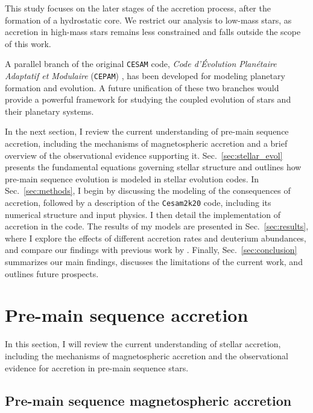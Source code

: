 \documentclass[12pt,a4paper]{article}
\begin{document}
This study focuses on the later stages of the accretion process, after the formation of a hydrostatic core. We restrict our analysis to low-mass stars, as accretion in high-mass stars remains less constrained and falls outside the scope of this work.

A parallel branch of the original \texttt{CESAM} code, \textit{Code d'Évolution Planétaire Adaptatif et Modulaire} (\texttt{CEPAM}) \parencite{GuillotMorel1995}, has been developed for modeling planetary formation and evolution. A future unification of these two branches would provide a powerful framework for studying the coupled evolution of stars and their planetary systems.

In the next section, I review the current understanding of pre-main sequence accretion, including the mechanisms of magnetospheric accretion and a brief overview of the observational evidence supporting it. Sec.~\ref{sec:stellar_evol} presents the fundamental equations governing stellar structure and outlines how pre-main sequence evolution is modeled in stellar evolution codes. In Sec.~\ref{sec:methods}, I begin by discussing the modeling of the consequences of accretion, followed by a description of the \texttt{Cesam2k20} code, including its numerical structure and input physics. I then detail the implementation of accretion in the code. The results of my models are presented in Sec.~\ref{sec:results}, where I explore the effects of different accretion rates and deuterium abundances, and compare our findings with previous work by \textcite{PallaStahler1993}. Finally, Sec.~\ref{sec:conclusion} summarizes our main findings, discusses the limitations of the current work, and outlines future prospects.

\section{Pre-main sequence accretion}
\label{sec:background}

In this section, I will review the current understanding of stellar accretion, including the mechanisms of magnetospheric accretion and the observational evidence for accretion in pre-main sequence stars. 

\subsection{Pre-main sequence magnetospheric accretion}
\label{sec:magnetospheric_accretion}
\end{document}
